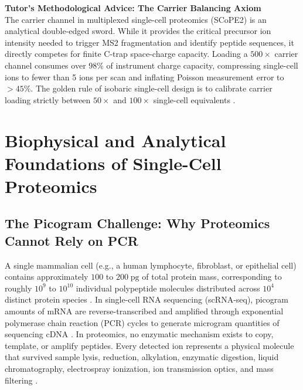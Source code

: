 \documentclass[11pt,twoside,openright]{book}
\begin{document}
\begin{notebox}
\textbf{Tutor's Methodological Advice: The Carrier Balancing Axiom}\\
The carrier channel in multiplexed single-cell proteomics (SCoPE2) is an analytical double-edged sword. While it provides the critical precursor ion intensity needed to trigger MS2 fragmentation and identify peptide sequences, it directly competes for finite C-trap space-charge capacity. Loading a $500\times$ carrier channel consumes over $98\%$ of instrument charge capacity, compressing single-cell ions to fewer than 5 ions per scan and inflating Poisson measurement error to $>45\%$. The golden rule of isobaric single-cell design is to calibrate carrier loading strictly between $50\times$ and $100\times$ single-cell equivalents \cite{slavov2021scope2, cheung2021carrier, sielaff2023evaluation}.
\end{notebox}

\section{Biophysical and Analytical Foundations of Single-Cell Proteomics}

\subsection{The Picogram Challenge: Why Proteomics Cannot Rely on PCR}

A single mammalian cell (e.g., a human lymphocyte, fibroblast, or epithelial cell) contains approximately $100$ to $200\;\text{pg}$ of total protein mass, corresponding to roughly $10^9$ to $10^{10}$ individual polypeptide molecules distributed across $10^4$ distinct protein species \cite{steger2021single, aebersold2016mass}. In single-cell RNA sequencing (scRNA-seq), picogram amounts of mRNA are reverse-transcribed and amplified through exponential polymerase chain reaction (PCR) cycles to generate microgram quantities of sequencing cDNA \cite{lun2016pooling}. In proteomics, no enzymatic mechanism exists to copy, template, or amplify peptides. Every detected ion represents a physical molecule that survived sample lysis, reduction, alkylation, enzymatic digestion, liquid chromatography, electrospray ionization, ion transmission optics, and mass filtering \cite{kelly2020single}.
\end{document}
